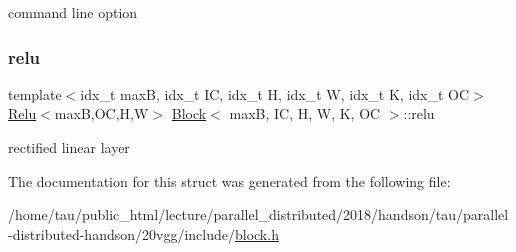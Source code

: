 command line option \mbox{\label{structBlock_a019bcbd200d92669079eaa3c0c00ddfc}} 
\subsubsection{\texorpdfstring{relu}{relu}}
{\footnotesize\ttfamily template$<$idx\+\_\+t maxB, idx\+\_\+t IC, idx\+\_\+t H, idx\+\_\+t W, idx\+\_\+t K, idx\+\_\+t OC$>$ \\
\hyperlink{structRelu}{Relu}$<$maxB,OC,H,W$>$ \hyperlink{structBlock}{Block}$<$ maxB, IC, H, W, K, OC $>$\+::relu}

rectified linear layer 

The documentation for this struct was generated from the following file\+:\begin{DoxyCompactItemize}
\item 
/home/tau/public\+\_\+html/lecture/parallel\+\_\+distributed/2018/handson/tau/parallel-\/distributed-\/handson/20vgg/include/\hyperlink{block_8h}{block.\+h}\end{DoxyCompactItemize}
